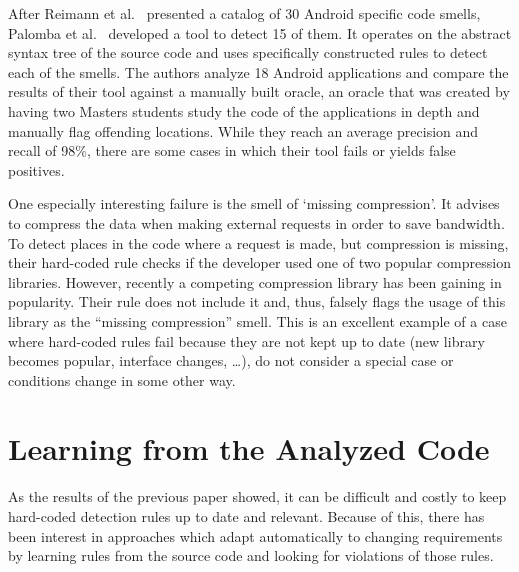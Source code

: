 After Reimann et al.~\cite{reimann2014tool} presented a catalog of 30 Android specific code smells, Palomba et al.~\cite{palomba2017lightweight} developed a tool to detect 15 of them.
It operates on the abstract syntax tree of the source code and uses specifically constructed rules to detect each of the smells.
The authors analyze 18 Android applications and compare the results of their tool against a manually built oracle,
an oracle that was created by having two Masters students study the code of the applications in depth and manually flag offending locations.
While they reach an average precision and recall of 98\%, there are some cases in which their tool fails or yields false positives.

One especially interesting failure is the smell of `missing compression'.
It advises to compress the data when making external requests in order to save bandwidth.
To detect places in the code where a request is made, but compression is missing, their hard-coded rule checks if the developer used one of two popular compression libraries.
However, recently a competing compression library has been gaining in popularity.
Their rule does not include it and, thus, falsely flags the usage of this library as the ``missing compression'' smell.
This is an excellent example of a case where hard-coded rules fail because they are not kept up to date (new library becomes popular, interface changes, \ldots), do not consider a special case or conditions change in some other way.

\section{Learning from the Analyzed Code}

As the results of the previous paper showed, it can be difficult and costly to keep hard-coded detection rules up to date and relevant.
Because of this, there has been interest in approaches which adapt automatically to changing requirements by learning rules from the source code and looking for violations of those rules.

